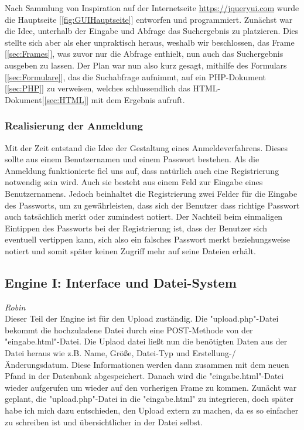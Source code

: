 \documentclass[12pt,a4paper,bibliography=totocnumbered,listof=totocnumbered]{scrartcl}
\begin{document}
\begin{minipage}{\linewidth}
Nach Sammlung von Inspiration auf der Internetseite \url{https://jqueryui.com} wurde die Hauptseite [\ref{fig:GUIHauptseite}] entworfen und programmiert. Zunächst war die Idee, unterhalb der Eingabe und Abfrage das Suchergebnis zu platzieren. Dies stellte sich aber als eher unpraktisch heraus, weshalb wir beschlossen, das Frame [\ref{sec:Frames}], was zuvor nur die Abfrage enthielt, nun auch das Suchergebnis ausgeben zu lassen. Der Plan war nun also kurz gesagt, mithilfe des Formulars [\ref{sec:Formulare}], das die Suchabfrage aufnimmt, auf ein PHP-Dokument [\ref{sec:PHP}] zu verweisen, welches schlussendlich das HTML-Dokument[\ref{sec:HTML}] mit dem Ergebnis aufruft. \\

\subsubsection{Realisierung der Anmeldung}
\label{RealisierungAnmeldung}
Mit der Zeit entstand die Idee der Gestaltung eines Anmeldeverfahrens. Dieses sollte aus einem Benutzernamen und einem Passwort bestehen. Als die Anmeldung funktionierte fiel uns auf, dass natürlich auch eine Registrierung notwendig sein wird. Auch sie besteht aus einem Feld zur Eingabe eines Benutzernamens. Jedoch beinhaltet die Registrierung zwei Felder für die Eingabe des Passworts, um zu gewährleisten, dass sich der Benutzer dass richtige Passwort auch tatsächlich merkt oder zumindest notiert. Der Nachteil beim einmaligen Eintippen des Passworts bei der Registrierung ist, dass der Benutzer sich eventuell vertippen kann, sich also ein falsches Passwort merkt beziehungsweise notiert und somit später keinen Zugriff mehr auf seine Dateien erhält.

\subsection{Engine I: Interface und Datei-System}
\emph{Robin}\\
Dieser Teil der Engine ist für den Upload zuständig. Die "upload.php"-Datei bekommt die hochzuladene Datei durch eine POST-Methode von der "eingabe.html"-Datei. Die Uplaod datei ließt nun die benötigten Daten aus der Datei heraus wie z.B. Name, Größe, Datei-Typ und Erstellung-/Änderungsdatum. Diese Informationen werden dann zusammen mit dem neuen Pfand in der Datenbank abgespeichert. Danach wird die "eingabe.html"-Datei wieder aufgerufen um wieder auf den vorherigen Frame zu kommen.
Zunächt war geplant, die "upload.php"-Datei in die "eingabe.html" zu integrieren, doch später habe ich mich dazu entschieden, den Upload extern zu machen, da es so einfacher zu schreiben ist und übersichtlicher in der Datei selbst.



\end{minipage}
\end{document}
